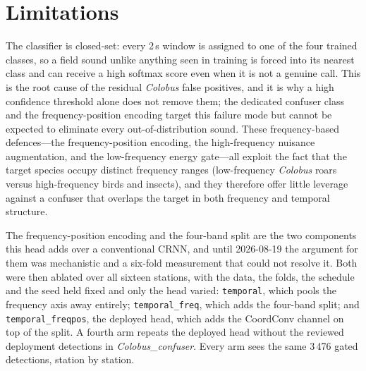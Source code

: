 \documentclass[review,3p,times]{elsarticle}
\begin{document}
\section*{Limitations}

The classifier is closed-set: every 2\,s window is assigned to one of the four
trained classes, so a field sound unlike anything seen in training is forced
into its nearest class and can receive a high softmax score even when it is not
a genuine call. This is the root cause of the residual \textit{Colobus} false
positives, and it is why a high confidence threshold alone does not remove them;
the dedicated confuser class and the frequency-position encoding target this
failure mode but cannot be expected to eliminate every out-of-distribution
sound. These frequency-based defences---the frequency-position encoding, the
high-frequency nuisance augmentation, and the low-frequency energy gate---all
exploit the fact that the target species occupy distinct frequency ranges
(low-frequency \textit{Colobus} roars versus high-frequency birds and insects),
and they therefore offer little leverage against a confuser that overlaps the
target in both frequency and temporal structure.

The frequency-position encoding and the four-band split are the two components
this head adds over a conventional CRNN, and until 2026-08-19 the argument for
them was mechanistic and a six-fold measurement that could not resolve it. Both
were then ablated over all sixteen stations, with the data, the folds, the
schedule and the seed held fixed and only the head varied: \texttt{temporal},
which pools the frequency axis away entirely; \texttt{temporal\_freq}, which
adds the four-band split; and \texttt{temporal\_freqpos}, the deployed head,
which adds the CoordConv channel on top of the split. A fourth arm repeats the
deployed head without the reviewed deployment detections in
\textit{Colobus\_confuser}. Every arm sees the same 3\,476 gated detections,
station by station.
\end{document}
